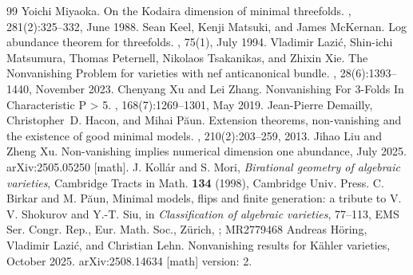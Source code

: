 \documentclass{article}
\begin{document}
\begin{thebibliography}{99}
   Yoichi Miyaoka. \newblock On the {Kodaira} dimension of minimal threefolds. , 281(2):325--332, June 1988.
   Sean Keel, Kenji Matsuki, and James McKernan. \newblock Log abundance theorem for threefolds. , 75(1), July 1994.
   Vladimir Lazić, Shin-ichi Matsumura, Thomas Peternell, Nikolaos Tsakanikas, and Zhixin Xie. \newblock The {Nonvanishing} {Problem} for varieties with nef anticanonical bundle. , 28(6):1393--1440, November 2023.
   Chenyang Xu and Lei Zhang. \newblock Nonvanishing {For} 3-{Folds} {In} {Characteristic} {P} {\textgreater} 5. , 168(7):1269--1301, May 2019.
   Jean-Pierre Demailly, Christopher~D. Hacon, and Mihai Păun. \newblock Extension theorems, non-vanishing and the existence of good minimal models. , 210(2):203--259, 2013.
   Jihao Liu and Zheng Xu. \newblock Non-vanishing implies numerical dimension one abundance, July 2025. \newblock arXiv:2505.05250 [math].
   J. Koll\'{a}r and S. Mori, \textit{Birational geometry of algebraic varieties}, Cambridge Tracts in Math. \textbf{134} (1998), Cambridge Univ. Press.
   C. Birkar and M. P\u aun, Minimal models, flips and finite generation: a tribute to V. V. Shokurov and Y.-T. Siu, in {\it Classification of algebraic varieties}, 77--113, EMS Ser. Congr. Rep., Eur. Math. Soc., Z\"urich, ; MR2779468
   Andreas Höring, Vladimir Lazić, and Christian Lehn. \newblock Nonvanishing results for {Kähler} varieties, October 2025. \newblock arXiv:2508.14634 [math] version: 2.
\end{thebibliography}
\end{document}
